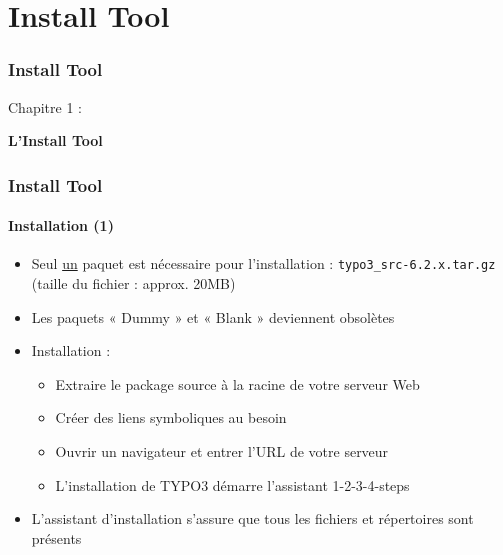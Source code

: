 %

\section{Install Tool}
\begin{frame}[fragile]
	\frametitle{Install Tool}

	\begin{center}\huge{Chapitre 1 :}\end{center}
	\begin{center}\huge{\color{typo3darkgrey}\textbf{L'Install Tool}}\end{center}

\end{frame}


\begin{frame}[fragile]
	\frametitle{Install Tool}
	\framesubtitle{Installation (1)}

	\begin{itemize}
		\item Seul \underline{un} paquet est nécessaire pour l'installation :\newline
				\texttt{typo3\_src-6.2.x.tar.gz} (taille du fichier : approx. 20MB)
		\item Les paquets « Dummy » et « Blank » deviennent obsolètes
		\item Installation :
			\begin{itemize}
				\item Extraire le package source à la racine de votre serveur Web
				\item Créer des liens symboliques au besoin
				\item Ouvrir un navigateur et entrer l'URL de votre serveur
				\item L'installation de TYPO3 démarre l'assistant 1-2-3-4-steps
			\end{itemize}
		\item L'assistant d'installation s'assure que tous les fichiers et répertoires sont présents
	\end{itemize}

\end{frame}

